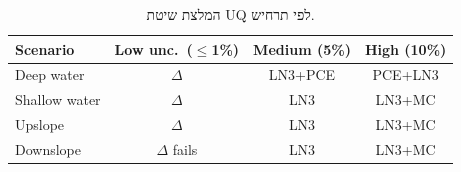 \documentclass[12pt,a4paper]{article}
\begin{document}
\begin{table}[H]
  \centering
  \caption{המלצת שיטת UQ לפי תרחיש.}
  \label{tab:summary_recommendations}
  \begin{english}
  \begin{tabular}{@{}lccc@{}}
    \toprule
    Scenario & Low unc.\ ($\leq$1\%) & Medium (5\%) & High (10\%)\\
    \midrule
    Deep water & $\Delta$ & LN3+PCE & PCE+LN3\\
    Shallow water & $\Delta$ & LN3 & LN3+MC\\
    Upslope & $\Delta$ & LN3 & LN3+MC\\
    Downslope & $\Delta$ fails & LN3 & LN3+MC\\
    \bottomrule
  \end{tabular}
  \end{english}
\end{table}
\end{document}
